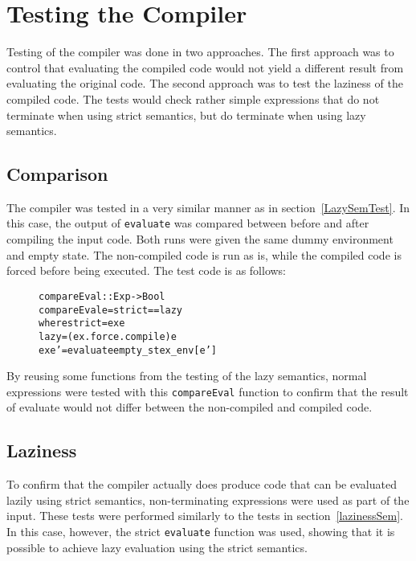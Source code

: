 \section{Testing the Compiler}

Testing of the compiler was done in two approaches. The first approach was to
control that evaluating the compiled code would not yield a different result
from evaluating the original code. The second approach was to test the laziness
of the compiled code. The tests would check rather simple expressions that do
not terminate when using strict semantics, but do terminate when using lazy
semantics.

\subsection{Comparison}

The compiler was tested in a very similar manner as in
section~\ref{LazySemTest}. In this case, the output of \texttt{evaluate}
was compared between
before and after compiling the input code. Both runs were given the same
dummy environment and empty state. The non-compiled code is run as is, while
the compiled code is forced before being executed.
The test code is as follows:

\begin{figure}[!ht]
\begin{alltt}
compareEval :: Exp -> Bool
compareEval e = strict == lazy
  where strict = ex e
        lazy   = (ex . force . compile) e
        ex e'  = evaluate empty_st ex_env [e']
\end{alltt}
\end{figure}

\noindent By reusing some functions from the testing of the lazy semantics,
normal expressions were tested with this \texttt{compareEval}
function to confirm that the result of evaluate would not differ between the
non-compiled and compiled code.

\subsection{Laziness}

To confirm that the compiler actually does produce code that can be evaluated
lazily using strict semantics, non-terminating expressions were used as part
of the input. These tests were performed similarly to the tests in
section~\ref{lazinessSem}. In this case, however, the strict \texttt{evaluate}
function was used, showing that it is possible to achieve lazy evaluation
using the strict semantics.

